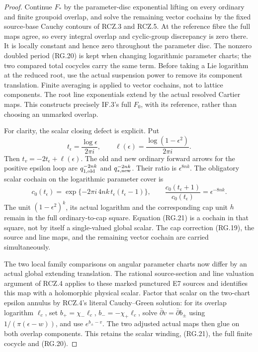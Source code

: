 \begin{proof}
Continue \(F_*\) by the parameter-disc exponential lifting
on every ordinary and finite groupoid overlap, and solve the
remaining vector cochains by the fixed source-base Cauchy
contours of RCZ.3 and RCZ.5. At the reference fibre the full
maps agree, so every integral overlap and cyclic-group
discrepancy is zero there. It is locally constant and hence
zero throughout the parameter disc. The nonzero doubled
period (RG.20) is kept when changing logarithmic parameter
charts; the two compared total cocycles carry the same
term. Before taking a Lie logarithm at the reduced root,
use the actual suspension power to remove its component
translation. Finite averaging is applied to vector
cochains, not to lattice components. The root line
exponentials extend by the actual resolved Cartier maps.
This constructs precisely IF.3's full \(F_0\), with its
reference, rather than choosing an unmarked overlap.

For clarity, the scalar closing defect is explicit. Put
\[
 t_\epsilon=\frac{\log\epsilon}{2\pi i},\qquad
 \ell(\epsilon)=\frac{\log(1-\epsilon^2)}{2\pi i}.
\]
Then \(t_v=-2t_\epsilon+\ell(\epsilon)\).
The old and new ordinary forward arrows for the positive
epsilon loop are \(q_{1,\rm old}^{-2nk}\) and
\(q_{*,\rm new}^{-2nk}\). Their ratio is
\(\epsilon^{8nk}\). The obligatory scalar cochain on the
logarithmic parameter cover is
\[
 c_0(t_\epsilon)=
       \exp\{-2\pi i\,4nk\,t_\epsilon(t_\epsilon-1)\},
 \qquad
 \frac{c_0(t_\epsilon+1)}{c_0(t_\epsilon)}
                              =\epsilon^{-8nk}.
                                                        \tag{RG.21}
\]
The unit \((1-\epsilon^2)^k\), its actual logarithm and
the corresponding cap unit \(h\) remain in the full
ordinary-to-cap square. Equation (RG.21) is a cochain in
that square, not by itself a single-valued global scalar.
The cap correction (RG.19), the source and line maps, and
the remaining vector cochain are carried simultaneously.

The two local family comparisons on angular parameter
charts now differ by an actual global extending
translation. The rational source-section and line
valuation argument of RCZ.4 applies to these marked
punctured E7 sources and identifies this map with a
holomorphic physical scalar. Factor that scalar on the
two-chart epsilon annulus by RCZ.4's literal
Cauchy--Green solution: for its overlap logarithm
\(\ell_c\), set \(b_+=\chi_-\ell_c\),
\(b_-=-\chi_+\ell_c\), solve
\(\bar\partial v=\bar\partial b_\pm\) using
\(1/(\pi(\epsilon-w))\), and use
\(e^{b_\pm-v}\). The two adjusted actual maps then glue
on both overlap components. This retains the scalar
winding, (RG.21), the full finite cocycle and (RG.20).


\end{proof}

